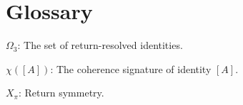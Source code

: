 \chapter*{Glossary}

\textbf{$\Omega_3$}: The set of return-resolved identities.

\textbf{$\chi([A])$}: The coherence signature of identity $[A]$.

\textbf{$X_\pi$}: Return symmetry.